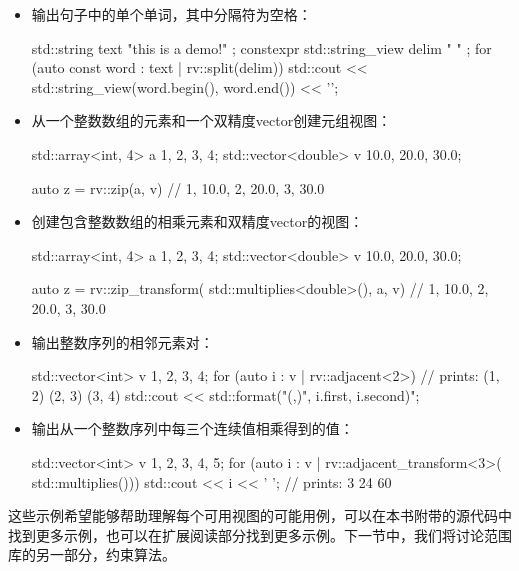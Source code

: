 \begin{itemize}
  \item
        输出句子中的单个单词，其中分隔符为空格：

        \begin{cpp}
std::string text{ "this is a demo!" };
constexpr std::string_view delim{ " " };
for (auto const word : text | rv::split(delim))
{
	std::cout << std::string_view(word.begin(),
								  word.end())
			  << '\n';
}
\end{cpp}

  \item
        从一个整数数组的元素和一个双精度vector创建元组视图：

        \begin{cpp}
std::array<int, 4> a {1, 2, 3, 4};
std::vector<double> v {10.0, 20.0, 30.0};

auto z = rv::zip(a, v)
// { {1, 10.0}, {2, 20.0}, {3, 30.0} }
\end{cpp}

  \item
        创建包含整数数组的相乘元素和双精度vector的视图：

        \begin{cpp}
std::array<int, 4> a {1, 2, 3, 4};
std::vector<double> v {10.0, 20.0, 30.0};

auto z = rv::zip_transform(
	std::multiplies<double>(), a, v)
// { {1, 10.0}, {2, 20.0}, {3, 30.0} }
\end{cpp}

  \item
        输出整数序列的相邻元素对：

        \begin{cpp}
std::vector<int> v {1, 2, 3, 4};
for (auto i : v | rv::adjacent<2>)
{
	// prints: (1, 2) (2, 3) (3, 4)
	std::cout << std::format("({},{})",
							 i.first, i.second)";
}
\end{cpp}

  \item
        输出从一个整数序列中每三个连续值相乘得到的值：

        \begin{cpp}
std::vector<int> v {1, 2, 3, 4, 5};
for (auto i : v | rv::adjacent_transform<3>(
	std::multiplies()))
{
	std::cout << i << ' '; // prints: 3 24 60
}
\end{cpp}

\end{itemize}

这些示例希望能够帮助理解每个可用视图的可能用例，可以在本书附带的源代码中找到更多示例，也可以在扩展阅读部分找到更多示例。下一节中，我们将讨论范围库的另一部分，约束算法。

